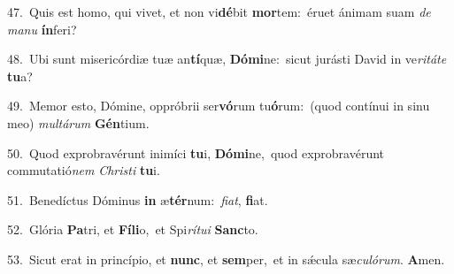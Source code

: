 {\numbfont\textcolor{\numbcolor}{47.}}~Quis est homo, qui vivet, et non vi\-\textbf{dé}\-bit \textbf{mor}\-tem:~\star éruet ánimam suam \textit{de} \textit{ma}\-\textit{nu} \textbf{ín}\-feri?\par
{\numbfont\textcolor{\numbcolor}{48.}}~Ubi sunt misericórdiæ tuæ an\-\textbf{tí}\-quæ, \textbf{Dó}\-\textbf{mi}ne:~\star sicut jurásti David in ve\-\textit{ri}\-\textit{tá}\textit{te} \textbf{tu}\-a?\par
{\numbfont\textcolor{\numbcolor}{49.}}~Memor esto, Dómine, oppróbrii ser\-\textbf{vó}\-rum tu\-\textbf{ó}\-rum:~\star (quod contínui in sinu meo) \textit{mul}\-\textit{tá}\textit{rum} \textbf{Gén}\-tium.\par
{\numbfont\textcolor{\numbcolor}{50.}}~Quod exprobravérunt inimíci \textbf{tu}\-i, \textbf{Dó}\-\textbf{mi}ne,~\star quod exprobravérunt commutatió\textit{nem} \textit{Chris}\-\textit{ti} \textbf{tu}\-i.\par
{\numbfont\textcolor{\numbcolor}{51.}}~Benedíctus Dóminus \textbf{in} æ\-\textbf{tér}\-num:~\star \textit{fi}\-\textit{at}, \textbf{fi}\-at.\par
{\numbfont\textcolor{\numbcolor}{52.}}~Glória \textbf{Pa}\-tri, et \textbf{Fí}\-\textbf{li}o,~\star et Spi\-\textit{rí}\-\textit{tu}\textit{i} \textbf{Sanc}\-to.\par
{\numbfont\textcolor{\numbcolor}{53.}}~Sicut erat in princípio, et \textbf{nunc}\-, et \textbf{sem}\-per,~\star et in sǽcula sæ\-\textit{cu}\-\textit{ló}\textit{rum}. \textbf{A}\-men.\par
